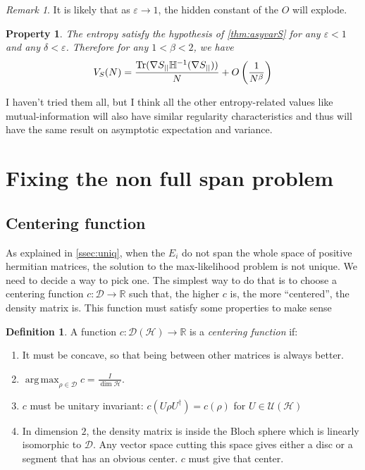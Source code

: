 \documentclass[10pt,a4paper]{report}
\theoremstyle{plain}
\newtheorem{prop}[thm]{Property}
\theoremstyle{definition}
\newtheorem{defn}{Definition}[chapter]
\theoremstyle{remark}
\newtheorem*{rem}{Remark}
\newcommand{\R}{\ensuremath{\mathbb{R}}}
\DeclareMathOperator{\Tr}{Tr}
\DeclareMathOperator{\argmax}{arg\,max}
\begin{document}
\begin{rem}
It is likely that as $\varepsilon \to 1$, the hidden constant
of the $O$ will explode.
\end{rem}

\begin{prop}
  The entropy satisfy the hypothesis of \cref{thm:asyvarS} for any $\varepsilon
  < 1$ and any $\delta < \varepsilon$. Therefore for any $1 < \beta < 2$, we have
  \[V_S(N) = \frac{\Tr(\nabla S\pr \mathbb H\inv(\nabla S\pr))}N
    +O\left(\frac 1 {N^\beta}\right)\]
\end{prop}



I haven't tried them all, but I think all the other entropy-related values like
mutual-information will also have similar regularity characteristics and thus will
have the same result on asymptotic expectation and variance.



\section{Fixing the non full span problem}\label{sec:fixspan}

\subsection{Centering function}

As explained in \cref{ssec:uniq}, when the $E_i$ do not span the whole space of
positive hermitian matrices, the solution to the max-likelihood problem is not
unique. We need to decide a way to pick one. The simplest way to do that is to
choose a centering function $c : \mathcal{D} \to \R$ such that, the higher $c$
is, the more ``centered'', the density matrix is. This function must satisfy
some properties to make sense

\begin{defn}
  A function $c : \mathcal{D}(\mathcal{H}) \to \R$ is a \emph{centering function} if:

  \begin{enumerate}
  \item It must be concave, so that being between other matrices is always better.
  \item $\displaystyle \argmax_{\rho \in \mathcal{D}} c = \frac I{\dim
      \mathcal{H}}$.
  \item $c$ must be unitary invariant: $c(U\rho U^\dagger) = c(\rho)$ for $U \in \mathcal{U}(\mathcal{H})$
  \item In dimension $2$, the density matrix is inside the Bloch sphere which is
    linearly isomorphic to $\mathcal{D}$. Any vector space cutting this space
    gives either a disc or a segment that has an obvious center. $c$ must give
    that center.
  \end{enumerate}
\end{defn}
\end{document}
